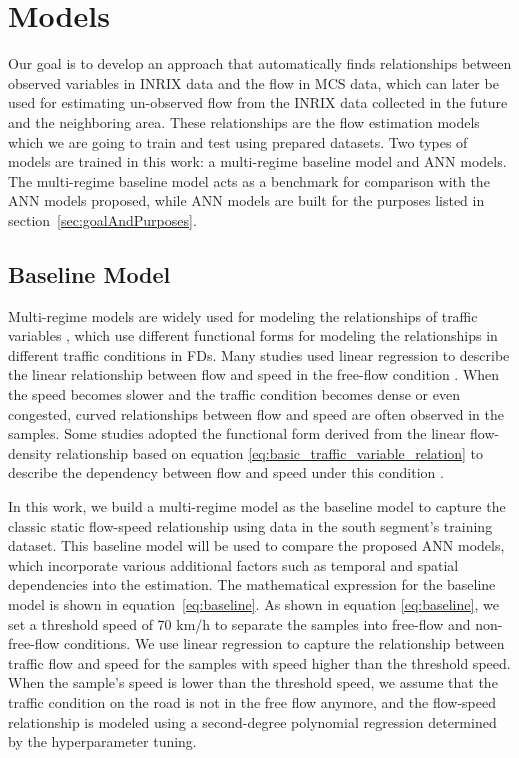 \documentclass[english]{kththesis}
\begin{document}
\section{Models}
\label{sec:models}
Our goal is to develop an approach that automatically finds relationships between observed variables in INRIX data and the flow in MCS data, which can later be used for estimating un-observed flow from the INRIX data collected in the future and the neighboring area. These relationships are the flow estimation models which we are going to train and test using prepared datasets. Two types of models are trained in this work: a multi-regime baseline model and ANN models. The multi-regime baseline model acts as a benchmark for comparison with the ANN models proposed, while ANN models are built for the purposes listed in section~\ref{sec:goalAndPurposes}.

\subsection{Baseline Model}
\label{subsec:baselineModel}

Multi-regime models are widely used for modeling the relationships of traffic variables \cite{tsanakas_emission_estimation, blandin_individual_speed, antoniou_ml_estimation, nielsen_flow-speed_relations}, which use different functional forms for modeling the relationships in different traffic conditions in FDs. Many studies used linear regression to describe the linear relationship between flow and speed in the free-flow condition \cite{blandin_individual_speed, nielsen_flow-speed_relations}. When the speed becomes slower and the traffic condition becomes dense or even congested, curved relationships between flow and speed are often observed in the samples. Some studies adopted the functional form derived from the linear flow-density relationship based on equation \ref{eq:basic_traffic_variable_relation} to describe the dependency between flow and speed under this condition \cite{blandin_individual_speed, nielsen_flow-speed_relations}.

In this work, we build a multi-regime model as the baseline model to capture the classic static flow-speed relationship using data in the south segment's training dataset. This baseline model will be used to compare the proposed ANN models, which incorporate various additional factors such as temporal and spatial dependencies into the estimation. The mathematical expression for the baseline model is shown in equation~\ref{eq:baseline}. As shown in equation \ref{eq:baseline}, we set a threshold speed of 70 km/h to separate the samples into free-flow and non-free-flow conditions. We use linear regression to capture the relationship between traffic flow and speed for the samples with speed higher than the threshold speed. When the sample's speed is lower than the threshold speed, we assume that the traffic condition on the road is not in the free flow anymore, and the flow-speed relationship is modeled using a second-degree polynomial regression determined by the hyperparameter tuning. 
\end{document}

